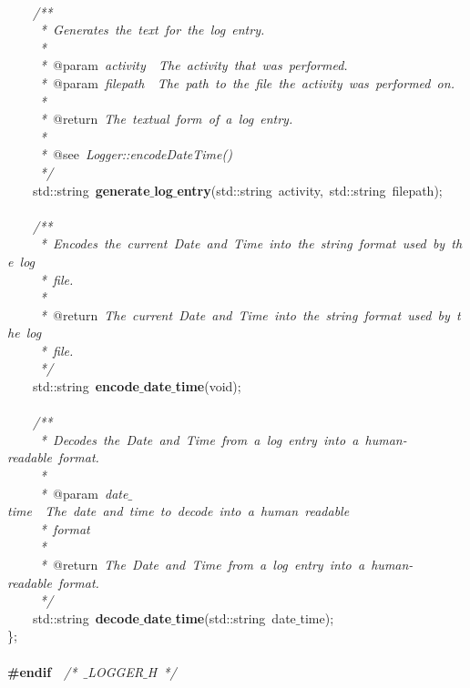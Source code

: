 \mbox{} \\
\mbox{}\ \ \ \ \textit{/**} \\
\mbox{}\textit{\ \ \ \ \ *\ Generates\ the\ text\ for\ the\ log\ entry.} \\
\mbox{}\textit{\ \ \ \ \ *} \\
\mbox{}\textit{\ \ \ \ \ *\ }@param\textit{\ activity\ \ The\ activity\ that\ was\ performed.} \\
\mbox{}\textit{\ \ \ \ \ *\ }@param\textit{\ filepath\ \ The\ path\ to\ the\ file\ the\ activity\ was\ performed\ on.} \\
\mbox{}\textit{\ \ \ \ \ *} \\
\mbox{}\textit{\ \ \ \ \ *\ }@return\textit{\ The\ textual\ form\ of\ a\ log\ entry.} \\
\mbox{}\textit{\ \ \ \ \ *} \\
\mbox{}\textit{\ \ \ \ \ *\ }@see\textit{\ Logger::encodeDateTime()} \\
\mbox{}\textit{\ \ \ \ \ */} \\
\mbox{}\ \ \ \ std::string\ \textbf{generate$\_$log$\_$entry}(std::string\ activity,\ std::string\ filepath); \\
\mbox{} \\
\mbox{}\ \ \ \ \textit{/**} \\
\mbox{}\textit{\ \ \ \ \ *\ Encodes\ the\ current\ Date\ and\ Time\ into\ the\ string\ format\ used\ by\ the\ log} \\
\mbox{}\textit{\ \ \ \ \ *\ file.} \\
\mbox{}\textit{\ \ \ \ \ *} \\
\mbox{}\textit{\ \ \ \ \ *\ }@return\textit{\ The\ current\ Date\ and\ Time\ into\ the\ string\ format\ used\ by\ the\ log} \\
\mbox{}\textit{\ \ \ \ \ *\ file.} \\
\mbox{}\textit{\ \ \ \ \ */} \\
\mbox{}\ \ \ \ std::string\ \textbf{encode$\_$date$\_$time}(void); \\
\mbox{} \\
\mbox{}\ \ \ \ \textit{/**} \\
\mbox{}\textit{\ \ \ \ \ *\ Decodes\ the\ Date\ and\ Time\ from\ a\ log\ entry\ into\ a\ human-readable\ format.} \\
\mbox{}\textit{\ \ \ \ \ *} \\
\mbox{}\textit{\ \ \ \ \ *\ }@param\textit{\ date$\_$time\ \ The\ date\ and\ time\ to\ decode\ into\ a\ human\ readable} \\
\mbox{}\textit{\ \ \ \ \ *\ format} \\
\mbox{}\textit{\ \ \ \ \ *\ } \\
\mbox{}\textit{\ \ \ \ \ *\ }@return\textit{\ The\ Date\ and\ Time\ from\ a\ log\ entry\ into\ a\ human-readable\ format.} \\
\mbox{}\textit{\ \ \ \ \ */} \\
\mbox{}\ \ \ \ std::string\ \textbf{decode$\_$date$\_$time}(std::string\ date$\_$time); \\
\mbox{}\}; \\
\mbox{} \\
\mbox{}\textbf{\#endif}\ \ \textit{/*\ $\_$LOGGER$\_$H\ */} \\

